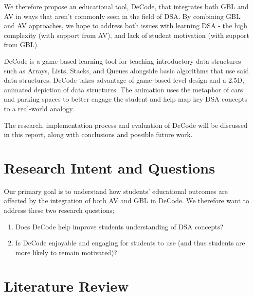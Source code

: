 \documentclass[10pt]{article}
\begin{document}
We therefore propose an educational tool, DeCode, that integrates both GBL and AV in ways that aren't commonly seen in the field of DSA. By combining GBL and AV approaches, we hope to address both issues with learning DSA - the high complexity (with support from AV), and lack of student motivation (with support from GBL)\par
DeCode is a game-based learning tool for teaching introductory data structures such as Arrays, Lists, Stacks, and Queues alongside basic algorithms that use said data structures. DeCode takes advantage of game-based level design and a 2.5D, animated depiction of data structures. The animation uses the metaphor of cars and parking spaces to better engage the student and help map key DSA concepts to a real-world analogy.\par
The research, implementation process and evaluation of DeCode will be discussed in this report, along with conclusions and possible future work.
\section{Research Intent and Questions}
Our primary goal is to understand how students' educational outcomes are affected by the integration of both AV and GBL in DeCode. We therefore want to address these two research questions;
\begin{enumerate}
  \item Does DeCode help improve students understanding of DSA concepts?
  \item Is DeCode enjoyable and engaging for students to use (and thus students are more likely to remain motivated)?
\end{enumerate}
\section{Literature Review}
\end{document}
